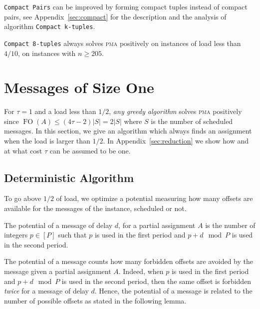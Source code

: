 \documentclass[a4paper,UKenglish,cleveref, autoref, thm-restate]{lipics-v2019}
\DeclareMathOperator{\Fo}{FO}
\newcommand\pma{\textsc{pma}\xspace}
\newcommand\compactpair{\texttt{Compact Pairs}\xspace}
\begin{document}
\compactpair can be improved by forming compact tuples instead of compact pairs, see Appendix~\ref{sec:compact} for the description 
 and the analysis of algorithm \texttt{Compact k-tuples}.


\begin{theorem}\label{th:k-tuples}
\texttt{Compact 8-tuples} always solves \pma positively on instances of load less than $4/10$, on instances with $n \geq 205$.
\end{theorem}


\section{Messages of Size One} \label{sec:small}

For $\tau = 1$ and a load less than $1/2$, \emph{any greedy algorithm} solves \pma positively since $\Fo(A) \leq (4\tau -2)|S| = 2|S|$ where $S$ is the number of scheduled messages. In this section, we give an algorithm which always finds an assignment when the load is larger than $1/2$. In Appendix~\ref{sec:reduction} we show how and at what cost $\tau$ can be assumed to be one.

\subsection{Deterministic Algorithm}

To go above $1/2$ of load, we optimize a potential measuring how many offsets are available for the messages of the instance, scheduled or not. 

\begin{definition}
The potential of a message of delay $d$, for a partial assignment $A$
is the number of integers $p \in [P]$ such that $p$ is used in the first period and $p+d \mod P$ is used in the second period.
\end{definition}

The potential of a message counts how many forbidden offsets are avoided by the message given a partial assignment $A$.
Indeed, when $p$ is used in the first period and $p+d \mod P$ is used in the second period,
then the same offset is forbidden \emph{twice} for a message of delay $d$. Hence, the potential of a message is related to the number of possible offsets as stated in the following lemma. 
\end{document}
